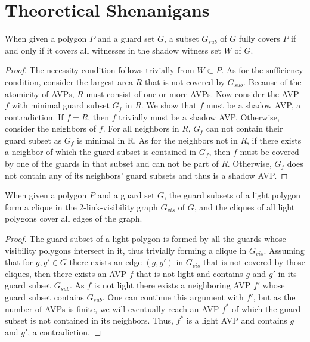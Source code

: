 \chapter{Theoretical Shenanigans}

\begin{theorem}
When given a polygon $P$ and a guard set $G$, a subset $G_{sub}$ of $G$ fully covers $P$ if and only if it covers all witnesses in the shadow witness set $W$ of $G$.
\end{theorem}
\begin{proof}
The necessity condition follows trivially from $W\subset P$. As for the sufficiency condition, consider the largest area $R$ that is not covered by $G_{sub}$. Because of the atomicity of AVPs, $R$ must consist of one or more AVPs. Now consider the AVP $f$ with minimal guard subset $G_{f}$ in $R$. We show that $f$ must be a shadow AVP, a contradiction. If $f = R$, then $f$ trivially must be a shadow AVP. Otherwise, consider the neighbors of $f$. For all neighbors in $R$, $G_{f}$ can not contain their guard subset as $G_{f}$ is minimal in R. As for the neighbors not in $R$, if there exists a neighbor of which the guard subset is contained in $G_{f}$, then $f$ must be covered by one of the guards in that subset and can not be part of $R$. Otherwise, $G_{f}$ does not contain any of its neighbors' guard subsets and thus is a shadow AVP.
\end{proof}

\begin{theorem}
When given a polygon $P$ and a guard set $G$, the guard subsets of a light polygon form a clique in the 2-link-visibility graph $G_{vis}$ of $G$, and the cliques of all light polygons cover all edges of the graph.
\end{theorem}
\begin{proof}
The guard subset of a light polygon is formed by all the guards whose visibility polygons intersect in it, thus trivially forming a clique in $G_{vis}$. Assuming that for $g,g'\in G$ there exists an edge $(g, g')$ in $G_{vis}$ that is not covered by those cliques, then there exists an AVP $f$ that is not light and contains $g$ and $g'$ in its guard subset $G_{sub}$. As $f$ is not light there exists a neighboring AVP $f'$ whose guard subset contains $G_{sub}$. One can continue this argument with $f'$, but as the number of AVPs is finite, we will eventually reach an AVP $f^{*}$ of which the guard subset is not contained in its neighbors. Thus, $f^{*}$ is a light AVP and contains $g$ and $g'$, a contradiction.
\end{proof}

